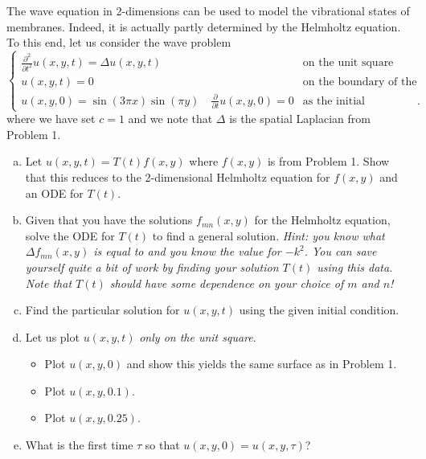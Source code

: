\documentclass[12pt]{amsbook}
\begin{document}
\newpage
\begin{problem}
The wave equation in 2-dimensions can be used to model the vibrational states of membranes. Indeed, it is actually partly determined by the Helmholtz equation. To this end, let us consider the wave problem
\[
\begin{cases}
    \frac{\partial^2}{\partial t^2} u(x,y,t) = \Delta u(x,y,t) & \textrm{on the unit square}\\
    u(x,y,t) = 0 & \textrm{on the boundary of the unit square}\\
    u(x,y,0) = \sin(3\pi x)\sin(\pi y) \quad \frac{\partial}{\partial t} u(x,y,0)=0 &\textrm{as the initial conditions}.
\end{cases}
\]
where we have set $c=1$ and we note that $\Delta$ is the spatial Laplacian from Problem 1.
\begin{enumerate}[(a)]
\vspace*{0.25cm}
    \item Let $u(x,y,t)=T(t)f(x,y)$ where $f(x,y)$ is from Problem 1. Show that this reduces to the 2-dimensional Helmholtz equation for $f(x,y)$ and an ODE for $T(t)$.
\vspace*{0.25cm}
    \item Given that you have the solutions $f_{mn}(x,y)$ for the Helmholtz equation, solve the ODE for $T(t)$ to find a general solution. \emph{Hint: you know what $\Delta f_{mn}(x,y)$ is equal to and you know the value for $-k^2$. You can save yourself quite a bit of work by finding your solution $T(t)$ using this data. Note that $T(t)$ should have some dependence on your choice of $m$ and $n$!}
\vspace*{0.25cm}
    \item Find the particular solution for $u(x,y,t)$ using the given initial condition. 
\vspace*{0.25cm}
    \item Let us plot $u(x,y,t)$ \emph{only on the unit square}.
\vspace*{0.25cm}
\begin{itemize}
    \item Plot $u(x,y,0)$ and show this yields the same surface as in Problem 1.
\vspace*{0.25cm}
    \item Plot $u(x,y,0.1)$.
\vspace*{0.25cm}
    \item Plot $u(x,y,0.25)$.
\vspace*{0.25cm}
\end{itemize}
    \item What is the first time $\tau$ so that $u(x,y,0)=u(x,y,\tau)$?
\end{enumerate}
\end{problem}
\end{document}

